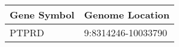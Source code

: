 \begin{tabular}{ll}
\toprule
Gene Symbol &    Genome Location \\
\midrule
      PTPRD & 9:8314246-10033790 \\
\bottomrule
\end{tabular}
